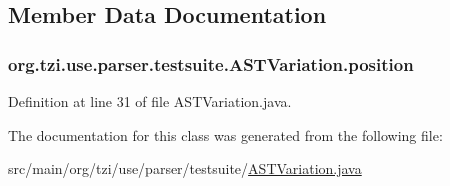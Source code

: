 \subsection{Member Data Documentation}
\hypertarget{classorg_1_1tzi_1_1use_1_1parser_1_1testsuite_1_1_a_s_t_variation_a6d7e13c21bfd2f915492912dab1ea5f8}{
\subsubsection[{position}]{ org.\-tzi.\-use.\-parser.\-testsuite.\-A\-S\-T\-Variation.\-position\hspace{0.3cm}{\ttfamily [protected]}}}\label{classorg_1_1tzi_1_1use_1_1parser_1_1testsuite_1_1_a_s_t_variation_a6d7e13c21bfd2f915492912dab1ea5f8}


Definition at line 31 of file A\-S\-T\-Variation.\-java.



The documentation for this class was generated from the following file\-:\begin{DoxyCompactItemize}
\item 
src/main/org/tzi/use/parser/testsuite/\hyperlink{_a_s_t_variation_8java}{A\-S\-T\-Variation.\-java}\end{DoxyCompactItemize}
